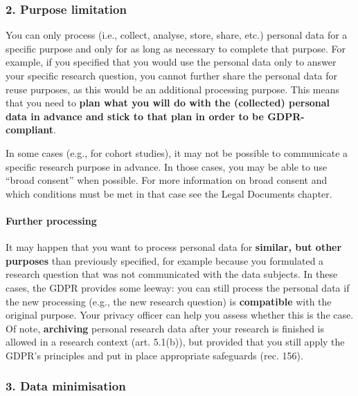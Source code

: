 \documentclass[
]{book}
\begin{document}
\hypertarget{purpose-limitation}{%
\subsubsection{2. Purpose limitation}\label{purpose-limitation}}

You can only process (i.e., collect, analyse, store, share, etc.) personal data
for a specific purpose and only for as long as necessary to complete that purpose.
For example, if you specified that you would use the personal data only to answer
your specific research question, you cannot further share the personal data for
reuse purposes, as this would be an additional processing purpose. This means
that you need to \textbf{plan what you will do with the (collected) personal data in
advance and stick to that plan in order to be GDPR-compliant}.

In some cases (e.g., for cohort studies), it may not be possible to communicate
a specific research purpose in advance. In those cases, you may be able to use
``broad consent'' when possible. For more information on broad consent and which
conditions must be met in that case see the Legal
Documents chapter.

\hypertarget{further-processing}{%
\paragraph{Further processing}\label{further-processing}}

It may happen that you want to process personal data for \textbf{similar, but other
purposes} than previously specified, for example because you formulated a research
question that was not communicated with the data subjects. In these cases, the
GDPR provides some leeway: you can still process the personal data if the new
processing (e.g., the new research question) is \textbf{compatible} with the original
purpose. Your
privacy officer
can help you assess whether this is the case. Of note, \textbf{archiving} personal
research data after your research is finished is allowed in a research context
(art. 5.1(b)),
but provided that you still apply the GDPR's principles and put in place appropriate
safeguards (rec. 156).

\hypertarget{data-minimisation}{%
\subsubsection{3. Data minimisation}\label{data-minimisation}}
\end{document}
